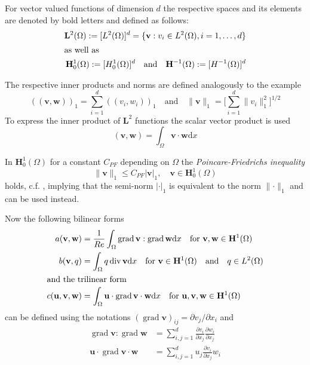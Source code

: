 \documentclass[a4paper,10pt,BCOR=15mm]{scrbook}
\DeclareMathOperator{\dive}{div}
\DeclareMathOperator{\grad}{grad}
\providecommand{\abs}[1]{\lvert#1\rvert}
\providecommand{\norm}[1]{\lVert#1 \rVert}
\providecommand{\inva}[1]{\text{d} #1}
\providecommand{\andi}[0]{\quad \text{and} \quad}
\begin{document}
For vector valued functions of dimension $d$ the respective spaces and its elements are denoted by bold letters and defined as follows:
\begin{subequations}
\begin{align*}
 \mathbf L^2 (\Omega):= [L^2(\Omega)]^d =  \{ \mathbf v: v_i \in L^2(\Omega), i = 1, \dotsc , d \} \\
\intertext{as well as}
 \mathbf H ^1 _0 (\Omega):= [H_0^1(\Omega)]^d  \andi{}  \mathbf H^{-1} (\Omega):= [H^{-1}(\Omega)]^d 
\end{align*}
\end{subequations}


The respective inner products and norms are defined analogously to the example
\begin{equation*}
((\mathbf v, \mathbf w ))_1 = \sum _{i=1} ^ d ((v_i, w_i ))_1 \andi{} \norm{\mathbf v}_1 = \biggl [ \sum _{i=1} ^ d \norm{v_i} _ 1 ^2 \biggr ] ^{1/2}
\end{equation*}
To express the inner product of $\mathbf L ^2$ functions the scalar vector product is used
\begin{equation*}
(\mathbf v, \mathbf w ) = \int _\Omega \mathbf v \cdot \mathbf w \inva{x}
\end{equation*}

In $\mathbf H_0^1(\Omega)$ for a constant $C_{PF}$ depending on $\Omega$ the \textit{Poincare-Friedrichs inequality} 
\begin{equation}\label{pfi}
 \norm{\mathbf v}_1 \leq C_{PF} \abs{\mathbf v}_1, \quad \mathbf v \in \mathbf H_0^1(\Omega)
\end{equation}
holds, c.f. \cite[p. 59]{zeid}, implying that the semi-norm $\abs{\cdot}_1$ is equivalent to the norm $\norm{\cdot}_1$ and can be used instead. 

Now the following bilinear forms 
\begin{subequations}
\begin{align*}
 a(\mathbf v, \mathbf w)&= \frac{1}{Re}  \int _\Omega \grad \mathbf v : \grad \mathbf w \inva{x} \quad \text{for }  \mathbf v, \mathbf w \in \mathbf H^1 (\Omega)\\
  b(\mathbf v, q) &=  \int _\Omega q \dive \mathbf v \inva{x} \quad \text{for }  \mathbf v \in \mathbf H^1 (\Omega) \andi{} q \in L^2(\Omega)\\
\intertext{and the trilinear form}
c(\mathbf u,\mathbf v, \mathbf w) &= \int _\Omega \mathbf u \cdot \grad \mathbf v \cdot \mathbf w \inva{x} \quad \text{for } \mathbf u, \mathbf v, \mathbf w \in \mathbf H^1 (\Omega)
\end{align*}
\end{subequations}
can be defined using the notations $(\grad \mathbf v)_{ij} = \partial v_j / \partial x_i$ and
\begin{align*}
\grad \mathbf v:\grad \mathbf w &= \sum_{i,j=1} ^d \frac{\partial v_i}{\partial x_j} \frac{ \partial w_i }{ \partial x_j} \\
\mathbf u \cdot \grad \mathbf v \cdot \mathbf w &= \sum_{i,j=1} ^d u_j \frac{ \partial v_i }{ \partial x_j}w_i
\end{align*}
\end{document}
